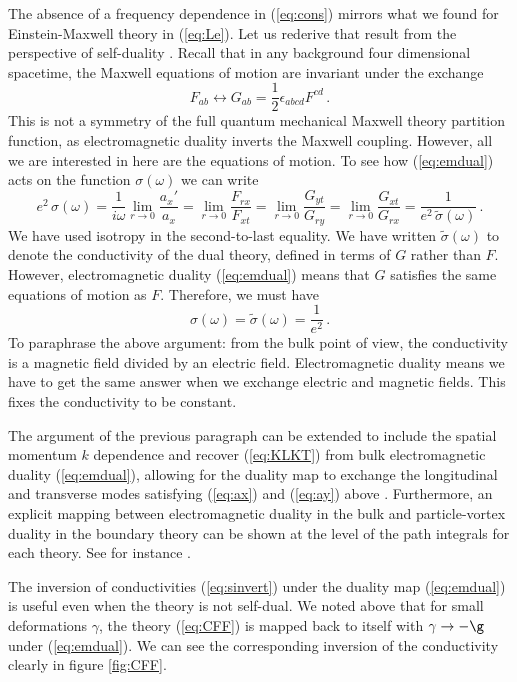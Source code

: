 \documentclass[10pt, oneside]{book}
\def\be{\begin{equation}}
\def\ee{\end{equation}}
\begin{document}
\begin{doublespace}
The absence of a frequency dependence in (\ref{eq:cons}) mirrors what we found for Einstein-Maxwell theory in (\ref{eq:Le}). Let us rederive that result from the perspective of self-duality \cite{Herzog:2007ij}. Recall that in any background four dimensional spacetime, the Maxwell equations of motion are invariant under the exchange
\be\label{eq:emdual}
F_{ab} \leftrightarrow G_{ab} = \frac{1}{2} \epsilon_{abcd} F^{cd} \,.
\ee
This is not a symmetry of the full quantum mechanical Maxwell theory partition function, as electromagnetic duality inverts the Maxwell coupling. However, all we are interested in here are the equations of motion. To see how (\ref{eq:emdual}) acts on the function $\sigma(\omega)$ we can write
\be\label{eq:sinvert}
e^2 \, \sigma(\omega) = \frac{1}{i \omega} \lim_{r \to 0} \frac{a_x'}{a_x} =  \lim_{r \to 0} \frac{F_{rx}}{F_{xt}} =  \lim_{r \to 0} \frac{G_{yt}}{G_{ry}}=  \lim_{r \to 0} \frac{G_{xt}}{G_{rx}} = \frac{1}{e^2 \, \widetilde \sigma(\omega)} \,.
\ee
We have used isotropy in the second-to-last equality. We have written $\widetilde \sigma(\omega)$ to denote the conductivity of the dual theory, defined in terms of $G$ rather than $F$. However, electromagnetic duality (\ref{eq:emdual}) means that $G$ satisfies the same equations of motion as $F$. Therefore, we must have
\be
\sigma(\omega) = \widetilde \sigma(\omega) = \frac{1}{e^2} \,.
\ee
To paraphrase the above argument: from the bulk point of view, the conductivity is a magnetic field divided by an electric field. Electromagnetic duality means we have to get the same answer when we exchange electric and magnetic fields. This fixes the conductivity to be constant.

The argument of the previous paragraph can be extended to include the spatial momentum $k$ dependence and recover (\ref{eq:KLKT}) from bulk electromagnetic duality (\ref{eq:emdual}), allowing for the duality map to exchange the longitudinal and transverse modes satisfying (\ref{eq:ax}) and (\ref{eq:ay}) above \cite{Herzog:2007ij}. Furthermore, an explicit mapping between electromagnetic duality in the bulk and particle-vortex duality in the boundary theory can be shown at the level of the path integrals for each theory. See for instance \cite{Witten:2003ya, Marolf:2006nd, Herzog:2007ij}.

The inversion of conductivities (\ref{eq:sinvert}) under the duality map (\ref{eq:emdual}) is useful even when the theory is not self-dual. We noted above that for small deformations $\gamma$, the theory (\ref{eq:CFF}) is mapped back to itself with $\gamma \to -\g$ under (\ref{eq:emdual}). We can see the corresponding inversion of the conductivity clearly in figure \ref{fig:CFF}.



\end{doublespace}
\end{document}
